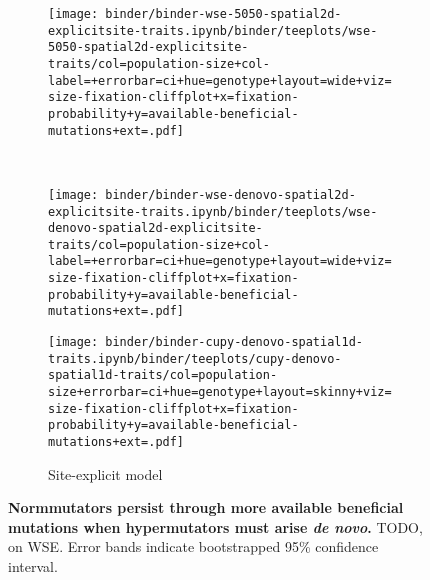 \begin{figure}[h]
\begin{minipage}{\textwidth}
    \vspace{-10ex}

    \begin{subfigure}[b]{\linewidth}
        \begin{minipage}{0.41\textwidth}
          \texttt{[image: binder/binder-wse-5050-spatial2d-explicitsite-traits.ipynb/binder/teeplots/wse-5050-spatial2d-explicitsite-traits/col=population-size+col-label=+errorbar=ci+hue=genotype+layout=wide+viz=size-fixation-cliffplot+x=fixation-probability+y=available-beneficial-mutations+ext=.pdf]}%
        \end{minipage}%
        \begin{minipage}{0.06\textwidth}
          ~
        \end{minipage}%
        \begin{minipage}{0.38\textwidth}
          \texttt{[image: binder/binder-wse-denovo-spatial2d-explicitsite-traits.ipynb/binder/teeplots/wse-denovo-spatial2d-explicitsite-traits/col=population-size+col-label=+errorbar=ci+hue=genotype+layout=wide+viz=size-fixation-cliffplot+x=fixation-probability+y=available-beneficial-mutations+ext=.pdf]}%
        \end{minipage}%
      \begin{minipage}{0.12\textwidth}
        \raggedright
        \large
        \vspace{10ex}
        \caption{Site-explicit model}
        \label{fig:spatial-structure:denovo}

        \texttt{[image: binder/binder-cupy-denovo-spatial1d-traits.ipynb/binder/teeplots/cupy-denovo-spatial1d-traits/col=population-size+errorbar=ci+hue=genotype+layout=skinny+viz=size-fixation-cliffplot+x=fixation-probability+y=available-beneficial-mutations+ext=.pdf]}%
      \end{minipage}%
    \end{subfigure}%

  \end{minipage}

  \vspace{-10ex}

  \begin{minipage}{\textwidth}
    \caption{%
      \textbf{Normmutators persist through more available beneficial mutations when hypermutators must arise \textit{de novo}.}
      \footnotesize
      TODO, on WSE.
      Error bands indicate bootstrapped 95\% confidence interval.
    }
    \label{fig:spatial-structure}
  \end{minipage}
\end{figure}
